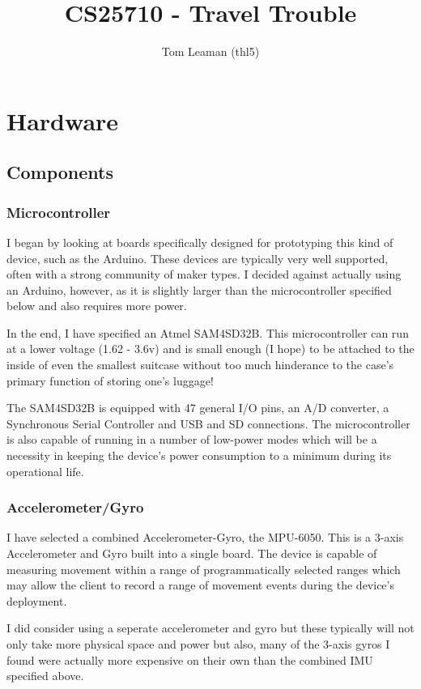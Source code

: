 \documentclass[a4paper, twoside]{article}
\title{CS25710 - Travel Trouble}
\author{Tom Leaman (thl5)}
\begin{document}
\maketitle
\newpage

\section{Hardware}

\subsection{Components}

\subsubsection{Microcontroller}
I began by looking at boards specifically designed for prototyping this kind of
device, such as the Arduino. These devices are typically very well supported,
often with a strong community of maker types. I decided against actually using
an Arduino, however, as it is slightly larger than the microcontroller specified
below and also requires more power.

In the end, I have specified an Atmel SAM4SD32B. This microcontroller can run at
a lower voltage (1.62 - 3.6v) and is small enough (I hope) to be attached to the
inside of even the smallest suitcase without too much hinderance to the case's
primary function of storing one's luggage!

The SAM4SD32B is equipped with 47 general I/O pins, an A/D converter, a
Synchronous Serial Controller and USB and SD connections. The microcontroller is
also capable of running in a number of low-power modes which will be a necessity
in keeping the device's power consumption to a minimum during its operational
life.

\subsubsection{Accelerometer/Gyro}
I have selected a combined Accelerometer-Gyro, the MPU-6050. This is a 3-axis
Accelerometer and Gyro built into a single board. The device is capable of
measuring movement within a range of programmatically selected ranges which may
allow the client to record a range of movement events during the device's
deployment.

I did consider using a seperate accelerometer and gyro but these typically will
not only take more physical space and power but also, many of the 3-axis gyros I
found were actually more expensive on their own than the combined IMU specified
above.
\end{document}
